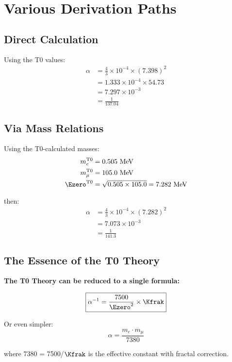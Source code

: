 	\section{Various Derivation Paths}
	
	\subsection{Direct Calculation}
	
	Using the T0 values:
	\begin{align}
		\alpha &= \frac{4}{3} \times 10^{-4} \times (7.398)^2\\
		&= 1.333 \times 10^{-4} \times 54.73\\
		&= 7.297 \times 10^{-3}\\
		&= \frac{1}{137.04}
	\end{align}
	
	\subsection{Via Mass Relations}
	
	Using the T0-calculated masses:
	\begin{align}
		m_e^{\text{T0}} &= 0.505 \text{ MeV}\\
		m_\mu^{\text{T0}} &= 105.0 \text{ MeV}\\
		\Ezero^{\text{T0}} &= \sqrt{0.505 \times 105.0} = 7.282 \text{ MeV}
	\end{align}
	
	then:
	\begin{align}
		\alpha &= \frac{4}{3} \times 10^{-4} \times (7.282)^2\\
		&= 7.073 \times 10^{-3}\\
		&= \frac{1}{141.3}
	\end{align}
	
	\subsection{The Essence of the T0 Theory}
	
	\begin{keyresult}
		\textbf{The T0 Theory can be reduced to a single formula:}
		
		\begin{equation}
			\boxed{\alpha^{-1} = \frac{7500}{\Ezero^2} \times \Kfrak}
		\end{equation}
		
		Or even simpler:
		\begin{equation}
			\boxed{\alpha = \frac{m_e \cdot m_\mu}{7380}}
		\end{equation}
		
		where 7380 = 7500/$\Kfrak$ is the effective constant with fractal correction.
	\end{keyresult}
	
